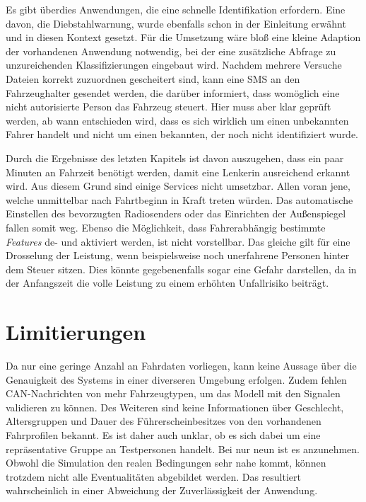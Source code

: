Es gibt überdies Anwendungen, die eine schnelle Identifikation erfordern. Eine davon, die Diebstahlwarnung, wurde ebenfalls schon in der Einleitung erwähnt und in diesen Kontext gesetzt. Für die Umsetzung wäre bloß eine kleine Adaption der vorhandenen Anwendung notwendig, bei der eine zusätzliche Abfrage zu unzureichenden Klassifizierungen eingebaut wird. Nachdem mehrere Versuche Dateien korrekt zuzuordnen gescheitert sind, kann eine SMS an den Fahrzeughalter gesendet werden, die darüber informiert, dass womöglich eine nicht autorisierte Person das Fahrzeug steuert. Hier muss aber klar geprüft werden, ab wann entschieden wird, dass es sich wirklich um einen unbekannten Fahrer handelt und nicht um einen bekannten, der noch nicht identifiziert wurde.

Durch die Ergebnisse des letzten Kapitels ist davon auszugehen, dass ein paar Minuten an Fahrzeit benötigt werden, damit eine Lenkerin ausreichend erkannt wird. Aus diesem Grund sind einige Services nicht umsetzbar. Allen voran jene, welche unmittelbar nach Fahrtbeginn in Kraft treten würden. Das automatische Einstellen des bevorzugten Radiosenders oder das Einrichten der Außenspiegel fallen somit weg. Ebenso die Möglichkeit, dass Fahrerabhängig bestimmte \textit{Features} de- und aktiviert werden, ist nicht vorstellbar. Das gleiche gilt für eine Drosselung der Leistung, wenn beispielsweise noch unerfahrene Personen hinter dem Steuer sitzen. Dies könnte gegebenenfalls sogar eine Gefahr darstellen, da in der Anfangszeit die volle Leistung zu einem erhöhten Unfallrisiko beiträgt.

\section{Limitierungen}

Da nur eine geringe Anzahl an Fahrdaten vorliegen, kann keine Aussage über die Genauigkeit des Systems in einer diverseren Umgebung erfolgen. Zudem fehlen CAN-Nachrichten von mehr Fahrzeugtypen, um das Modell mit den Signalen validieren zu können. Des Weiteren sind keine Informationen über Geschlecht, Altersgruppen und Dauer des Führerscheinbesitzes von den vorhandenen Fahrprofilen bekannt. Es ist daher auch unklar, ob es sich dabei um eine repräsentative Gruppe an Testpersonen handelt. Bei nur neun ist es anzunehmen. Obwohl die Simulation den realen Bedingungen sehr nahe kommt, können trotzdem nicht alle Eventualitäten abgebildet werden. Das resultiert wahrscheinlich in einer Abweichung der Zuverlässigkeit der Anwendung.

